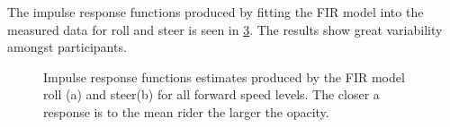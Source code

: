 The impulse response functions produced by fitting the FIR model into the measured data for roll and steer is seen in \cref{fig:IRF_all}. The results show great variability amongst participants.
\begin{figure}
    \centering
    \begin{subfigure}[b]{\textwidth}
        \centering
        \caption{}
        \label{fig:IRF_phi}
    \end{subfigure}
    \begin{subfigure}[b]{\textwidth}
        \centering
        \caption{}            
        \label{fig:IRF_delta}
    \end{subfigure}
    \caption{Impulse response functions estimates produced by the FIR model  roll (a) and steer(b) for all forward speed levels. The closer a response is to the mean rider the larger the opacity.}
    \label{fig:IRF_all}
 \end{figure}
